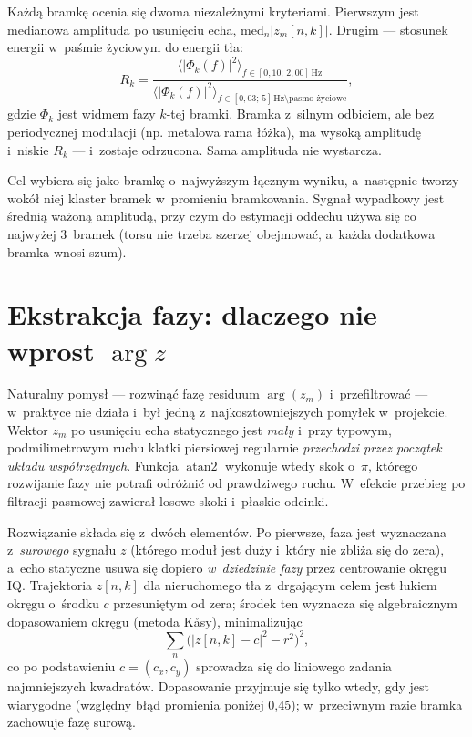 \documentclass[12pt,a4paper,oneside]{report}
\begin{document}
Każdą bramkę ocenia się dwoma niezależnymi kryteriami. Pierwszym jest
medianowa amplituda po usunięciu echa, $\mathrm{med}_n |z_m[n,k]|$. Drugim ---
stosunek energii w~paśmie życiowym do energii tła:
\begin{equation}
  R_k = \frac{\big\langle |\Phi_k(f)|^2 \big\rangle_{f \in [0{,}10;\,2{,}00]\,\mathrm{Hz}}}
             {\big\langle |\Phi_k(f)|^2 \big\rangle_{f \in [0{,}03;\,5]\,\mathrm{Hz}\setminus\text{pasmo życiowe}}},
  \label{eq:ber}
\end{equation}
gdzie $\Phi_k$ jest widmem fazy $k$-tej bramki. Bramka z~silnym odbiciem, ale
bez periodycznej modulacji (np. metalowa rama łóżka), ma wysoką amplitudę
i~niskie $R_k$ --- i~zostaje odrzucona. Sama amplituda nie wystarcza.

Cel wybiera się jako bramkę o~najwyższym łącznym wyniku, a~następnie tworzy
wokół niej klaster bramek w~promieniu bramkowania. Sygnał wypadkowy jest
średnią ważoną amplitudą, przy czym do estymacji oddechu używa się co najwyżej
3~bramek (torsu nie trzeba szerzej obejmować, a~każda dodatkowa bramka wnosi
szum).

\section{Ekstrakcja fazy: dlaczego nie wprost \texorpdfstring{$\arg z$}{arg z}}
\label{sec:faza}
Naturalny pomysł --- rozwinąć fazę residuum $\arg(z_m)$ i~przefiltrować ---
w~praktyce nie działa i~był jedną z~najkosztowniejszych pomyłek w~projekcie.
Wektor $z_m$ po usunięciu echa statycznego jest \emph{mały} i~przy typowym,
podmilimetrowym ruchu klatki piersiowej regularnie \emph{przechodzi przez
początek układu współrzędnych}. Funkcja $\operatorname{atan2}$ wykonuje wtedy
skok o~$\pi$, którego rozwijanie fazy nie potrafi odróżnić od prawdziwego
ruchu. W~efekcie przebieg po filtracji pasmowej zawierał losowe skoki
i~płaskie odcinki.

Rozwiązanie składa się z~dwóch elementów. Po pierwsze, faza jest wyznaczana
z~\emph{surowego} sygnału $z$ (którego moduł jest duży i~który nie zbliża się
do zera), a~echo statyczne usuwa się dopiero \emph{w~dziedzinie fazy} przez
centrowanie okręgu IQ. Trajektoria $z[n,k]$ dla nieruchomego tła z~drgającym
celem jest łukiem okręgu o~środku $c$ przesuniętym od zera; środek ten
wyznacza się algebraicznym dopasowaniem okręgu (metoda Kåsy), minimalizując
\begin{equation}
  \sum_n \Big( |z[n,k] - c|^2 - r^2 \Big)^2,
  \label{eq:okrag}
\end{equation}
co po podstawieniu $c = (c_x, c_y)$ sprowadza się do liniowego zadania
najmniejszych kwadratów. Dopasowanie przyjmuje się tylko wtedy, gdy jest
wiarygodne (względny błąd promienia poniżej 0,45); w~przeciwnym razie bramka
zachowuje fazę surową.
\end{document}
